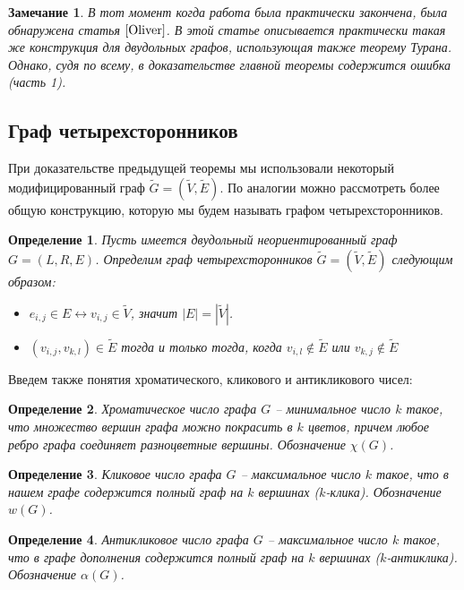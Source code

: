 \documentclass[a4paper]{article}
\newtheorem*{mremark}{Замечание}
\newtheorem*{mdefinition}{Определение}
\begin{document}
\begin{mremark}
    В тот момент когда работа была практически закончена, была обнаружена статья $\cite{Oliver}$. В этой статье 
    описывается практически такая же конструкция для двудольных графов, использующая также теорему Турана. 
    Однако, судя по всему, в доказательстве главной теоремы содержится ошибка (часть 1).
\end{mremark}


\subsection{Граф четырехсторонников}
При доказательстве предыдущей теоремы мы использовали некоторый модифицированный граф $\widetilde{G} = 
(\widetilde{V}, \widetilde{E})$. По аналогии можно рассмотреть более общую конструкцию, которую мы 
будем называть графом четырехсторонников. 
\begin{mdefinition}
    Пусть имеется двудольный неориентированный граф $G = (L, R, E)$. Определим граф четырехсторонников 
    $\widetilde{G} = (\widetilde{V}, \widetilde{E})$ следующим образом:
    \begin{itemize}[noitemsep]
        \item $e_{i,j}\in E \leftrightarrow v_{i,j}\in \widetilde{V}$, значит $|E| = |\widetilde{V}|$.
        \item $(v_{i,j}, v_{k, l}) \in \widetilde{E}$ тогда и только тогда, когда $v_{i,l}\notin \widetilde{E}$ 
        или $v_{k,j}\notin\widetilde{E}$
    \end{itemize}
\end{mdefinition}

Введем также понятия хроматического, кликового и антикликового чисел:
\begin{mdefinition}

    Хроматическое число графа $G$ -- минимальное число $k$ такое, что множество вершин графа можно 
    покрасить в $k$ цветов, причем любое ребро графа соединяет разноцветные вершины. Обозначение $\chi(G)$.
\end{mdefinition}
\begin{mdefinition} 
    Кликовое число графа $G$ -- максимальное число $k$ такое, что в нашем графе содержится полный 
    граф на $k$ вершинах ($k$-клика). Обозначение $w(G)$.
\end{mdefinition}
\begin{mdefinition} 
    Антикликовое число графа $G$ -- максимальное число $k$ такое, что в графе дополнения содержится 
    полный граф на $k$ вершинах ($k$-антиклика). Обозначение $\alpha(G)$.
\end{mdefinition}
\end{document}
